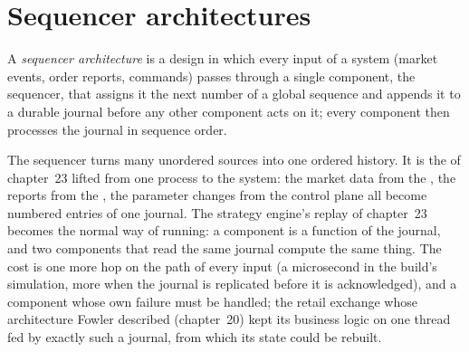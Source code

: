 \section{Sequencer architectures}

\begin{definition}\label{def:ll:resilience:sequencer}
A \emph{sequencer architecture} is a design in which every input of a system (market events,
order reports, commands) passes through a single component, the sequencer, that assigns it the next number of a global
sequence and appends it to a durable journal before any other component acts on it; every component then processes the
journal in sequence order.
\end{definition}

The sequencer turns many unordered sources into one ordered history. It is the  of chapter~23 lifted from one
process to the system: the market data from the , the reports from the , the parameter changes from
the control plane all become numbered entries of one journal. The strategy engine's replay of chapter~23 becomes the normal
way of running: a component is a function of the journal, and two components that read the same journal compute the same
thing. The cost is one more hop on the path of every input (a microsecond in the build's simulation, more when the journal
is replicated before it is acknowledged), and a component whose own failure must be handled; the retail exchange whose architecture Fowler described
(chapter~20) kept its business logic on one thread fed by exactly such a journal, from which its state could be rebuilt.

